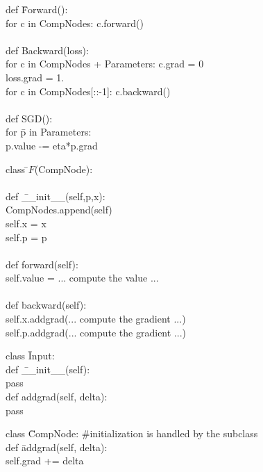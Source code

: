 {

\begin{tabbing}
def \=Forward(): \\
   \>for c in CompNodes: c.forward() \\
\\
def \>Backward(loss): \\
    \> for c in CompNodes + Parameters: c.grad = 0 \\
    \> loss.grad = 1. \\
    \> for c in CompNodes[::-1]: c.backward() \\
    \\
def \> SGD(): \\
    \> for \= p in Parameters: \\
       \>\>p.value -= eta*p.grad
\end{tabbing}


\begin{tabbing}
  class \=$F$(CompNode): \\
  \\
    \>def \=\_\_init\_\_(self,p,x): \\
        \>\>CompNodes.append(self) \\
        \>\>self.x = x \\
        \>\>self.p = p \\       
\\
    \>def forward(self): \\
        \>\>self.value = ... compute the value ... \\
\\
    \>def backward(self): \\
        \>\>self.x.addgrad(... compute the gradient ...) \\
        \>\>self.p.addgrad(... compute the gradient ...)        
\end{tabbing}


\vfill
\begin{tabbing}
class \=Input: \\
    \>def \=\_\_init\_\_(self): \\
        \>\>pass \\
    \>def \>addgrad(self, delta): \\
    \>\>pass
\end{tabbing}

\vfill
\begin{tabbing}
class \=CompNode: \#initialization is handled by the subclass \\
   \>def \=addgrad(self, delta): \\
   \>\>self.grad += delta
\end{tabbing}

}
